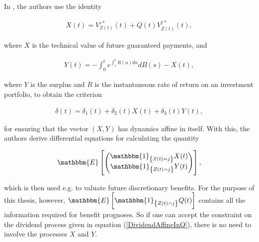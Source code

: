 \documentclass{book}
\newcommand{\1}[1]{\mathbbm{1}_{\left\lbrace #1 \right\rbrace}}
\newcommand{\expec}[1][def]{\mathbbm{E} \left[ #1 \right]}
\theoremstyle{break}
\theoremstyle{remark}
\newenvironment{remark}
  {\pushQED{\qed}\renewcommand{\qedsymbol}{\scalebox{1.4}{$\circ$}}\remarkx}
  {\popQED\endremarkx}
\numberwithin{equation}{section}
\begin{document}
\begin{remark}
In \cite{Lollike}, the authors use the identity

\begin{align*}
    X(t) = V_{Z(t)}^{\circ*}(t) + Q(t) V_{Z(t)}^{\dagger*}(t),
\end{align*}

where $X$ is the technical value of future guaranteed payments, and

\begin{align*}
    Y(t) = - \int_0^t e^{\int_s^t R(u)du} dB(s) - X(t),
\end{align*}

where $Y$ is the surplus and $R$ is the instantaneous rate of return on an investment portfolio, to obtain the criterion

\begin{align*}
    \delta(t) = \delta_1(t) + \delta_2(t) X(t) + \delta_3(t) Y(t),
\end{align*}

for ensuring that the vector $(X,Y)$ has dynamics affine in itself. With this, the authors derive differential equations for calculating the quantity

\begin{align*}
    \expec[\begin{pmatrix}\1{Z(t)=j} X(t)\\\1{Z(t)=j} Y(t)\end{pmatrix}],
\end{align*}

which is then used e.g. to valuate future discretionary benefits. For the purpose of this thesis, however, $\expec[\1{Z(t)=j} Q(t)]$ contains all the information required for benefit prognoses. So if one can accept the constraint on the dividend process given in equation (\ref{DividendAffineInQ}), there is no need to involve the processes $X$ and $Y$.
\end{remark}
\end{document}
